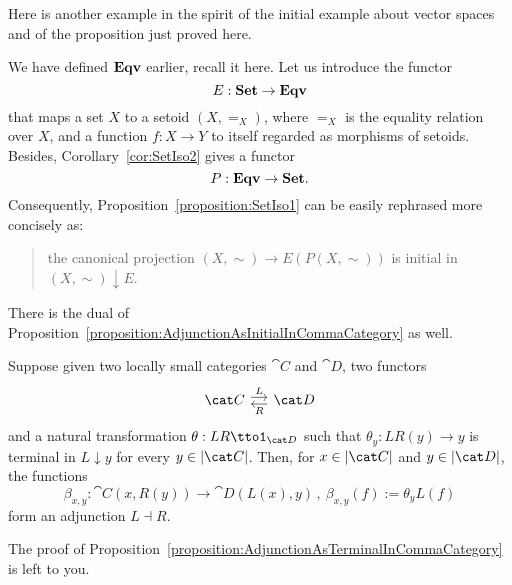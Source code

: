 Here is another example in the spirit of the initial example about
vector spaces and of the proposition just proved here.

\begin{example}
  We have defined \(\mathbf{Eqv}\) earlier, recall it here. Let us introduce
  the functor
  \[E : \mathbf{Set} \to \mathbf{Eqv}\] that maps a set \(X\) to a setoid
  \((X, =_X)\), where \(=_X\) is the equality relation over \(X\), and
  a function \(f : X \to Y\) to itself regarded as morphisms of
  setoids. Besides, Corollary~\ref{cor:SetIso2} gives a functor
  \[P : \mathbf{Eqv} \to \mathbf{Set} .\] Consequently,
  Proposition~\ref{proposition:SetIso1} can be easily rephrased more
  concisely as:
  \begin{quotation}
    the canonical projection \((X, \sim) \to E(P(X, \sim))\) is
    initial in \((X, \sim) \downarrow E\).
  \end{quotation}
\end{example}

There is the dual of
Proposition~\ref{proposition:AdjunctionAsInitialInCommaCategory} as
well.

\begin{proposition}\label{proposition:AdjunctionAsTerminalInCommaCategory}
  Suppose given two locally small categories \(\cat C\) and
  \(\cat D\), two functors
  \[\begin{tikzcd}[column sep=small]
      \cat C \ar["L", r, shift left] & \cat D \ar["R", l, shift left]
    \end{tikzcd}\] and a natural transformation
  \(\theta : LR \tto \id_{\cat D}\) such that
  \(\theta_y : LR(y) \to y\) is terminal in \(L {\downarrow} y\) for
  every \(y \in \obj{\cat C}\).  Then, for \(x \in \obj{\cat C}\) and
  \(y \in \obj{\cat D}\), the functions
  \[\beta_{x,y} : \cat C(x, R(y)) \to \cat D(L(x), y) \,,\
    \beta_{x,y}(f) := \theta_y L(f)\] form an adjunction
  \(L \dashv R\).
\end{proposition}

\begin{exercise}
  The proof of
  Proposition~\ref{proposition:AdjunctionAsTerminalInCommaCategory} is
  left to you.
\end{exercise}

